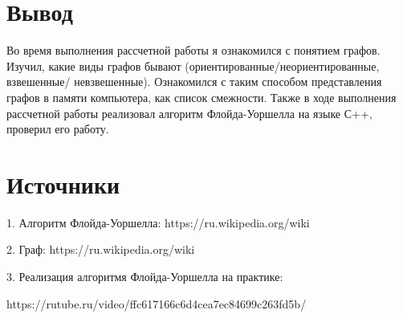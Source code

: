 \documentclass[14 pt]{article}
\begin{document}
\section{Вывод}
\begin{вывод}
Во время выполнения рассчетной работы я ознакомился с понятием графов. Изучил, какие виды графов бывают (ориентированные/неориентированные, взвешенные/ невзвешенные). Ознакомился с таким способом представления графов в памяти компьютера, как список смежности. Также в ходе выполнения рассчетной работы реализовал алгоритм Флойда-Уоршелла на языке С++, проверил его работу.
\end{вывод}
\section{Источники}
\begin{источники}
1. Алгоритм Флойда-Уоршелла: https://ru.wikipedia.org/wiki
\par
2. Граф: https://ru.wikipedia.org/wiki
\par
3. Реализация алгоритмя Флойда-Уоршелла на практике: \par
https://rutube.ru/video/ffc617166c6d4cea7ec84699c263fd5b/
\end{источники}
\end{document}
